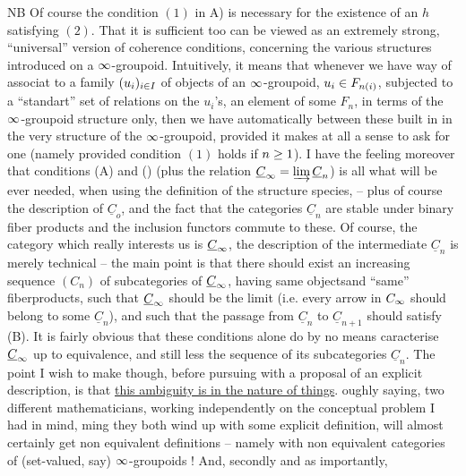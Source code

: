 NB Of course the condition $(1)$ in A) is necessary for the existence of an $h$ satisfying $(2)$. That it is sufficient too can be viewed as an extremely strong, ``universal'' version of coherence conditions, concerning the various structures introduced on a $\infty$-groupoid. Intuitively, it means that whenever we have  way of associat to a  family  $(u_i)_{i\in I}$ of objects of an $\infty$-groupoid, $u_i\in F_{n(i)}$,  subjected to a ``standart'' set of relations on the $u_i$'s, an element of some $F_n$, in terms of the $\infty$-groupoid structure only, then we have automatically  between these built in in the very structure of the $\infty$-groupoid, provided it makes at all a sense to ask for one (namely provided condition $(1)$ holds if $n\geq1$). I have the feeling moreover that conditions (A) and () (plus the relation $\underline{C}_{\infty}=\varinjlim\underline{C}_n$) is all what will be ever needed, when using the definition of the structure species, -- plus of course the description of $\underline{C}_o$, and the  fact that the categories $\underline{C}_n$ are stable under binary fiber products and  the inclusion functors commute to these.
Of course, the category which really interests us is $\underline{C}_{\infty}$, the description of the intermediate $\underline{C}_n$ is merely technical  -- the main point is that there should exist an increasing sequence $(C_n)$ of subcategories of $\underline{C}_{\infty}$, having same objects\handwritten{[}and ``same'' fiberproducts\handwritten{]}, such that $\underline{C}_{\infty}$ should be the limit (i.e. every arrow in $C_{\infty}$ should belong  to some $\underline{C}_n$), and such that the passage from $\underline{C}_n$ to $\underline{C}_{n+1}$ should satisfy (B). It is fairly obvious that these conditions alone do by no means caracterise $\underline{C}_{\infty}$ up to equivalence, and still less the sequence of its subcategories $\underline{C}_n$. The point I wish to make though, before pursuing with a proposal of an explicit description, is that \uline{this ambiguity is in the nature of things}. oughly saying, two different mathematicians, working independently on the conceptual problem I had in mind, ming they both wind up with some explicit definition, will almost certainly get non equivalent definitions -- namely with non equivalent categories of (set-valued, say) $\infty$-groupoids ! And, secondly and as importantly,

